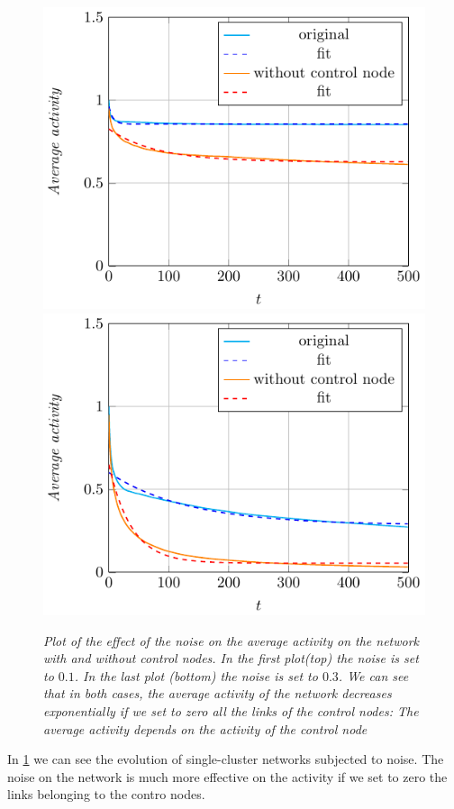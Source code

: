 \begin{figure}[h]
\centering
\includegraphics[scale=0.8]{images/noise01.pdf}
\includegraphics[scale=0.8]{images/noise03.pdf}
\caption{\emph{Plot of the effect of the noise on the average activity on the network with and without control nodes. In the first plot(top) the noise is set to $0.1$. In the last plot (bottom) the noise is set to $0.3$. We can see that in both cases, the average activity of the network decreases exponentially if we set to zero all the links of the control nodes: The average activity depends on the activity of the control node}}
\label{fig:noises}
\end{figure}
In \ref{fig:noises} we can see the evolution of single-cluster networks subjected to noise. The noise on the network is much more effective on the activity if we set to zero the links belonging to the contro nodes.

